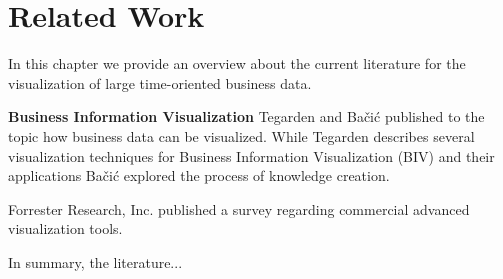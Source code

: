 \chapter{Related Work}
\label{chap:related Work}
In this chapter we provide an overview about the current literature for the visualization of large time-oriented business data. 






\textbf{Business Information Visualization} Tegarden and Bačić\cite{Bacic,Bacic2013,Bacic2012TheCreation,Tegarden1999} published to the topic how business data can be visualized. While Tegarden describes several visualization techniques for Business Information Visualization (BIV) and their applications Bačić explored the process of knowledge creation\cite{Bacic2012}.

Forrester Research, Inc. published a survey\cite{Evelson2012} regarding commercial advanced visualization tools.

In summary, the literature...